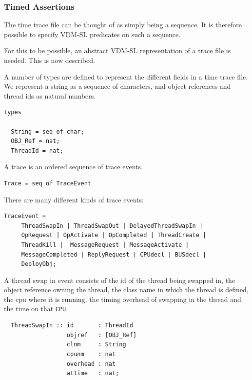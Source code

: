 \documentclass{overturerepchap}
\begin{document}

\subsubsection{Timed Assertions}

The time trace file can be thought of as simply being a sequence. It
is therefore possible to specify VDM-SL predicates on such a sequence.

For this to be possible, an abstract VDM-SL representation of a trace
file is needed.  This is now described.

A number of types are defined to represent the different fields in a
time trace file. We represent a string as a sequence of characters,
and object references and thread ids as natural numbers.

\begin{lstlisting}
types

  String = seq of char;
  OBJ_Ref = nat;
  ThreadId = nat;
\end{lstlisting}

A trace is an ordered sequence of trace events.

\begin{lstlisting}
Trace = seq of TraceEvent
\end{lstlisting}

There are many different kinds of trace events:

\begin{lstlisting}
TraceEvent = 
     ThreadSwapIn | ThreadSwapOut | DelayedThreadSwapIn |
     OpRequest | OpActivate | OpCompleted | ThreadCreate |
     ThreadKill |  MessageRequest | MessageActivate |
     MessageCompleted | ReplyRequest | CPUdecl | BUSdecl |
     DeployObj; 
\end{lstlisting}

A thread swap in event consists of the id of the thread being swapped
in, the object reference owning the thread, the class name in
which the thread is defined, the cpu where it is running, the 
timing overhead of swapping in the thread and the time on that \texttt{CPU}.

\begin{lstlisting}
  ThreadSwapIn :: id       : ThreadId
                  objref   : [OBJ_Ref]
                  clnm     : String
                  cpunm    : nat 
                  overhead : nat
                  attime   : nat;
\end{lstlisting}
\end{document}
